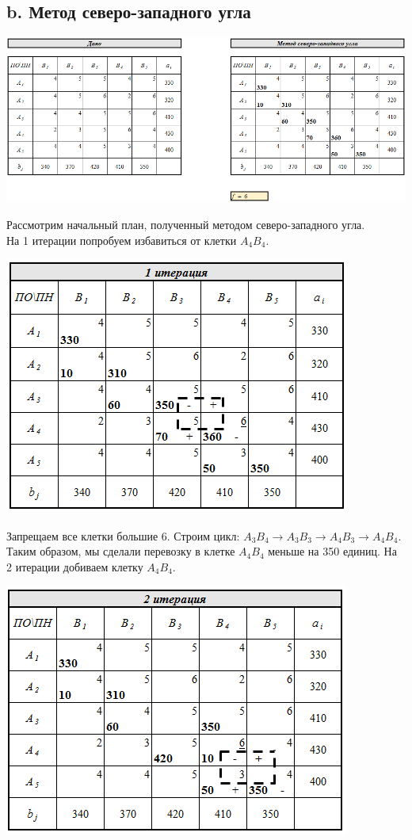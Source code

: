 \documentclass[14pt,a4paper,fleqn]{extarticle}
\begin{document}
\subsection*{b. Метод северо-западного угла}
\begin{center}
	\includegraphics[scale=0.51]{4}
\end{center}
Рассмотрим начальный план, полученный методом северо-западного угла.\\
На 1 итерации попробуем избавиться от клетки $A_4B_4$.
\begin{center}
	\includegraphics[scale=0.64]{5}
\end{center}
Запрещаем все клетки большие 6. Строим цикл: $A_3B_4 \rightarrow A_3B_3 \rightarrow A_4B_3 \rightarrow A_4B_4$.\\
Таким образом, мы сделали перевозку в клетке $A_4B_4$ меньше на 350 единиц.
\newpage
На 2 итерации добиваем клетку $A_4B_4$.
\begin{center}
	\includegraphics[scale=0.64]{6}
\end{center}
\end{document}
